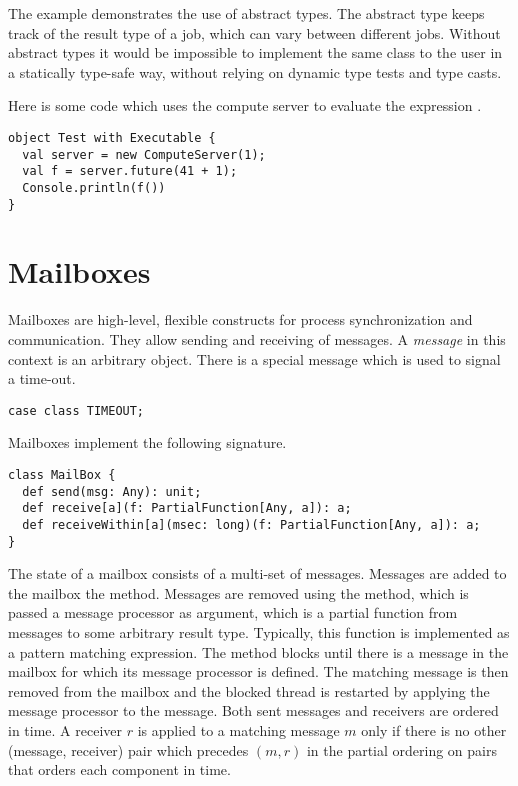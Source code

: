 \documentclass[a4paper,12pt,twoside,titlepage]{book}
\begin{document}
{The example demonstrates the use of abstract types. The abstract type
 keeps track of the result type of a job, which can vary
between different jobs. Without abstract types it would be impossible
to implement the same class to the user in a statically type-safe
way, without relying on dynamic type tests and type casts.


Here is some code which uses the compute server to evaluate 
the expression .
\begin{lstlisting}
object Test with Executable {
  val server = new ComputeServer(1);
  val f = server.future(41 + 1);
  Console.println(f())
}
\end{lstlisting}

\section{Mailboxes}
\label{sec:mailbox}

Mailboxes are high-level, flexible constructs for process
synchronization and communication. They allow sending and receiving of
messages. A {\em message} in this context is an arbitrary object.
There is a special message  which is used to signal a
time-out.
\begin{lstlisting}
case class TIMEOUT;
\end{lstlisting}
Mailboxes implement the following signature.
\begin{lstlisting}
class MailBox {
  def send(msg: Any): unit;
  def receive[a](f: PartialFunction[Any, a]): a;
  def receiveWithin[a](msec: long)(f: PartialFunction[Any, a]): a;
}
\end{lstlisting}
The state of a mailbox consists of a multi-set of messages.
Messages are added to the mailbox the  method. Messages
are removed using the  method, which is passed a message
processor  as argument, which is a partial function from
messages to some arbitrary result type. Typically, this function is
implemented as a pattern matching expression. The 
method blocks until there is a message in the mailbox for which its
message processor is defined.  The matching message is then removed
from the mailbox and the blocked thread is restarted by applying the
message processor to the message. Both sent messages and receivers are
ordered in time. A receiver $r$ is applied to a matching message $m$
only if there is no other (message, receiver) pair which precedes $(m,
r)$ in the partial ordering on pairs that orders each component in
time.

}
\end{document}
